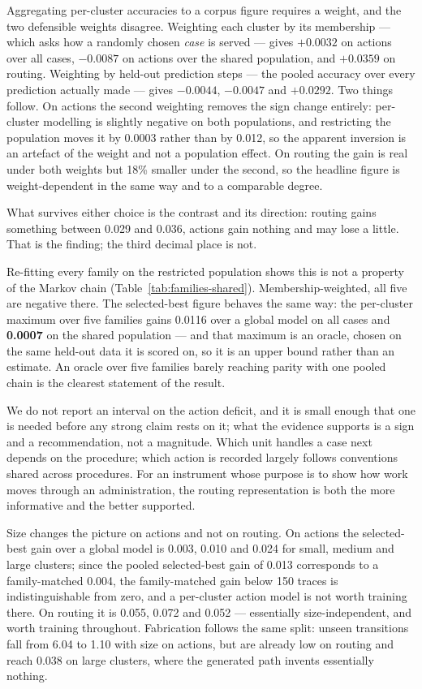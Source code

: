 Aggregating per-cluster accuracies to a corpus figure requires a weight, and the two defensible
weights disagree. Weighting each cluster by its membership --- which asks how a randomly chosen
\emph{case} is served --- gives $+0.0032$ on actions over all cases, $-0.0087$ on actions over
the shared population, and $+0.0359$ on routing. Weighting by held-out prediction steps --- the
pooled accuracy over every prediction actually made --- gives $-0.0044$, $-0.0047$ and
$+0.0292$. Two things follow. On actions the second weighting removes the sign change entirely:
per-cluster modelling is slightly negative on both populations, and restricting the population
moves it by 0.0003 rather than by 0.012, so the apparent inversion is an artefact of the weight
and not a population effect. On routing the gain is real under both weights but 18\% smaller
under the second, so the headline figure is weight-dependent in the same way and to a
comparable degree.

What survives either choice is the contrast and its direction: routing gains something between
0.029 and 0.036, actions gain nothing and may lose a little. That is the finding; the third
decimal place is not.

Re-fitting every family on the restricted population shows this is not a property of the Markov
chain (Table~\ref{tab:families-shared}). Membership-weighted, all five are negative there. The
selected-best figure behaves the same way: the per-cluster maximum over five families gains
0.0116 over a global model on all cases and \textbf{0.0007} on the shared population --- and
that maximum is an oracle, chosen on the same held-out data it is scored on, so it is an upper
bound rather than an estimate. An oracle over five families barely reaching parity with one
pooled chain is the clearest statement of the result.

We do not report an interval on the action deficit, and it is small enough that one is needed
before any strong claim rests on it; what the evidence supports is a sign and a recommendation,
not a magnitude. Which unit handles a case next depends on the procedure; which action is recorded
largely follows conventions shared across procedures. For an instrument whose purpose is to show
how work moves through an administration, the routing representation is both the more
informative and the better supported.

Size changes the picture on actions and not on routing. On actions the selected-best gain over a
global model is 0.003, 0.010 and 0.024 for small, medium and large clusters; since the pooled
selected-best gain of 0.013 corresponds to a family-matched 0.004, the family-matched gain below
150 traces is indistinguishable from zero, and a per-cluster action model is not worth training
there. On routing it is 0.055, 0.072 and 0.052 ---
essentially size-independent, and worth training throughout. Fabrication follows the same
split: unseen transitions fall from 6.04 to 1.10 with size on actions, but are already low on
routing and reach 0.038 on large clusters, where the generated path invents essentially nothing.

